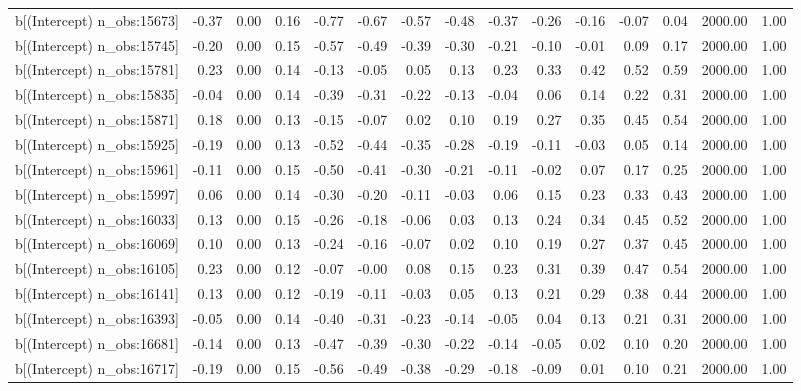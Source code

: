\begin{table}[ht]
\begin{tabular}{rrrrrrrrrrrrrrr}
  b[(Intercept) n\_obs:15673] & -0.37 & 0.00 & 0.16 & -0.77 & -0.67 & -0.57 & -0.48 & -0.37 & -0.26 & -0.16 & -0.07 & 0.04 & 2000.00 & 1.00 \\ 
  b[(Intercept) n\_obs:15745] & -0.20 & 0.00 & 0.15 & -0.57 & -0.49 & -0.39 & -0.30 & -0.21 & -0.10 & -0.01 & 0.09 & 0.17 & 2000.00 & 1.00 \\ 
  b[(Intercept) n\_obs:15781] & 0.23 & 0.00 & 0.14 & -0.13 & -0.05 & 0.05 & 0.13 & 0.23 & 0.33 & 0.42 & 0.52 & 0.59 & 2000.00 & 1.00 \\ 
  b[(Intercept) n\_obs:15835] & -0.04 & 0.00 & 0.14 & -0.39 & -0.31 & -0.22 & -0.13 & -0.04 & 0.06 & 0.14 & 0.22 & 0.31 & 2000.00 & 1.00 \\ 
  b[(Intercept) n\_obs:15871] & 0.18 & 0.00 & 0.13 & -0.15 & -0.07 & 0.02 & 0.10 & 0.19 & 0.27 & 0.35 & 0.45 & 0.54 & 2000.00 & 1.00 \\ 
  b[(Intercept) n\_obs:15925] & -0.19 & 0.00 & 0.13 & -0.52 & -0.44 & -0.35 & -0.28 & -0.19 & -0.11 & -0.03 & 0.05 & 0.14 & 2000.00 & 1.00 \\ 
  b[(Intercept) n\_obs:15961] & -0.11 & 0.00 & 0.15 & -0.50 & -0.41 & -0.30 & -0.21 & -0.11 & -0.02 & 0.07 & 0.17 & 0.25 & 2000.00 & 1.00 \\ 
  b[(Intercept) n\_obs:15997] & 0.06 & 0.00 & 0.14 & -0.30 & -0.20 & -0.11 & -0.03 & 0.06 & 0.15 & 0.23 & 0.33 & 0.43 & 2000.00 & 1.00 \\ 
  b[(Intercept) n\_obs:16033] & 0.13 & 0.00 & 0.15 & -0.26 & -0.18 & -0.06 & 0.03 & 0.13 & 0.24 & 0.34 & 0.45 & 0.52 & 2000.00 & 1.00 \\ 
  b[(Intercept) n\_obs:16069] & 0.10 & 0.00 & 0.13 & -0.24 & -0.16 & -0.07 & 0.02 & 0.10 & 0.19 & 0.27 & 0.37 & 0.45 & 2000.00 & 1.00 \\ 
  b[(Intercept) n\_obs:16105] & 0.23 & 0.00 & 0.12 & -0.07 & -0.00 & 0.08 & 0.15 & 0.23 & 0.31 & 0.39 & 0.47 & 0.54 & 2000.00 & 1.00 \\ 
  b[(Intercept) n\_obs:16141] & 0.13 & 0.00 & 0.12 & -0.19 & -0.11 & -0.03 & 0.05 & 0.13 & 0.21 & 0.29 & 0.38 & 0.44 & 2000.00 & 1.00 \\ 
  b[(Intercept) n\_obs:16393] & -0.05 & 0.00 & 0.14 & -0.40 & -0.31 & -0.23 & -0.14 & -0.05 & 0.04 & 0.13 & 0.21 & 0.31 & 2000.00 & 1.00 \\ 
  b[(Intercept) n\_obs:16681] & -0.14 & 0.00 & 0.13 & -0.47 & -0.39 & -0.30 & -0.22 & -0.14 & -0.05 & 0.02 & 0.10 & 0.20 & 2000.00 & 1.00 \\ 
  b[(Intercept) n\_obs:16717] & -0.19 & 0.00 & 0.15 & -0.56 & -0.49 & -0.38 & -0.29 & -0.18 & -0.09 & 0.01 & 0.10 & 0.21 & 2000.00 & 1.00 \\ 

\end{tabular}
\end{table}
